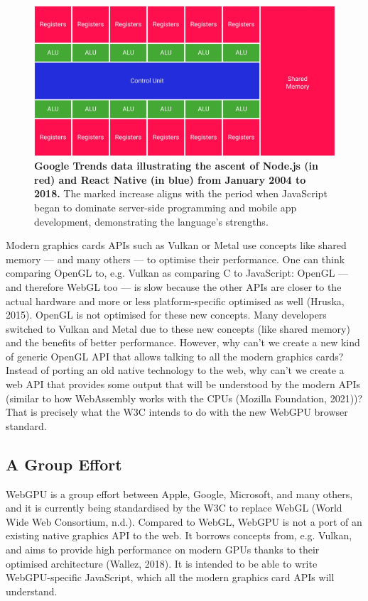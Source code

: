 \documentclass[10pt]{article}
\begin{document}
\begin{sloppypar}
  \begin{figure}[ht]
    \centering
    \includegraphics[width=\textwidth]{figures/shared-memory.png}
    \caption[Google Trends data illustrating the ascent of Node.js and React Native.]{\textbf{Google Trends data illustrating the ascent of Node.js (in red) and React Native (in blue) from January 2004 to 2018.} The marked increase aligns with the period when JavaScript began to dominate server-side programming and mobile app development, demonstrating the language’s strengths.}
    \label{fig:shared-memory}
  \end{figure}

  Modern graphics cards APIs such as Vulkan or Metal use concepts like shared memory — and many others — to optimise their performance. One can think comparing OpenGL to, e.g. Vulkan as comparing C to JavaScript: OpenGL — and therefore WebGL too — is slow because the other APIs are closer to the actual hardware and more or less platform-specific optimised as well (Hruska, 2015). OpenGL is not optimised for these new concepts. Many developers switched to Vulkan and Metal due to these new concepts (like shared memory) and the benefits of better performance. However, why can’t we create a new kind of generic OpenGL API that allows talking to all the modern graphics cards? Instead of porting an old native technology to the web, why can’t we create a web API that provides some output that will be understood by the modern APIs (similar to how WebAssembly works with the CPUs (Mozilla Foundation, 2021))? That is precisely what the W3C intends to do with the new WebGPU browser standard.

  \subsection{A Group Effort}
  \label{subsec:a-group-effort}

  WebGPU is a group effort between Apple, Google, Microsoft, and many others, and it is currently being standardised by the W3C to replace WebGL (World Wide Web Consortium, n.d.). Compared to WebGL, WebGPU is not a port of an existing native graphics API to the web. It borrows concepts from, e.g. Vulkan, and aims to provide high performance on modern GPUs thanks to their optimised architecture (Wallez, 2018). It is intended to be able to write WebGPU-specific JavaScript, which all the modern graphics card APIs will understand.


\end{sloppypar}
\end{document}
